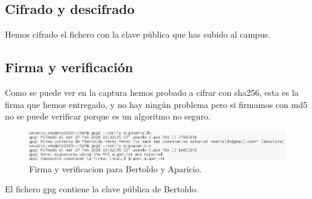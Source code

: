 \documentclass[11pt]{article}
\begin{document}
    \subsection{Cifrado y descifrado}
      \par
      Hemos cifrado el fichero con la clave pública que has subido al campus.

    \subsection{Firma y verificación}
      \par
      Como se puede ver en la captura hemos probado a cifrar con sha256, esta es la firma que
      hemos entregado, y no hay ningún problema pero si firmamos con md5 no se puede verificar
      porque es un algoritmo no seguro.

      \begin{figure}[H]
        \centering
        \includegraphics[width = \textwidth]{signverify}
        \caption{Firma y verificacion para Bertoldo y Aparicio.}
      \end{figure}

      \par
      El fichero gpg contiene la clave pública de Bertoldo.
\end{document}
